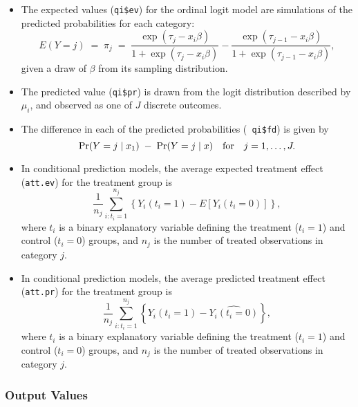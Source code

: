 \begin{itemize}
\item The expected values ({\tt qi\$ev}) for the ordinal logit model
  are simulations of the predicted probabilities for each category: 
\begin{equation*}
E(Y = j) \; = \; \pi_{j} \; = \; \frac{\exp(\tau_j - x_i \beta)}
{1 + \exp(\tau_j - x_i \beta)} - \frac{\exp(\tau_{j-1} - x_i \beta)}{1 +
 \exp(\tau_{j-1} - x_i \beta)},
\end{equation*}
given a draw of $\beta$ from its sampling distribution.  

\item The predicted value ({\tt qi\$pr}) is drawn from the logit
  distribution described by $\mu_i$, and observed as one of $J$
  discrete outcomes.  

\item The difference in each of the predicted probabilities ({\tt
    qi\$fd}) is given by
  \begin{equation*}
    \Pr(Y=j \mid x_1) \;-\; \Pr(Y=j \mid x) \quad {\rm for} \quad
    j=1,\dots,J.
  \end{equation*}

\item In conditional prediction models, the average expected treatment
  effect ({\tt att.ev}) for the treatment group is 
    \begin{equation*} \frac{1}{n_j}\sum_{i:t_i=1}^{n_j} \left\{ Y_i(t_i=1) -
      E[Y_i(t_i=0)] \right\},
    \end{equation*} 
where $t_{i}$ is a binary explanatory variable defining the treatment
($t_{i}=1$) and control ($t_{i}=0$) groups, and $n_j$ is the 
number of treated observations in category $j$.

\item In conditional prediction models, the average predicted treatment
  effect ({\tt att.pr}) for the treatment group is 
    \begin{equation*} \frac{1}{n_j}\sum_{i:t_i=1}^{n_j} \left\{ Y_i(t_i=1) -
      \widehat{Y_i(t_i=0)} \right\},
    \end{equation*} 
where $t_{i}$ is a binary explanatory variable defining the treatment
($t_{i}=1$) and control ($t_{i}=0$) groups, and $n_j$ is the 
number of treated observations in category $j$.

\end{itemize}

\subsubsection{Output Values}

